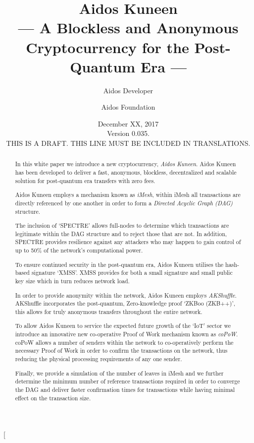 \documentclass[a4paper,10pt,twocolumn]{article}
\title{Aidos Kuneen \\ --- A Blockless and Anonymous Cryptocurrency for the Post-Quantum Era ---}
\author{
	Aidos Developer \and Aidos Foundation
}
\date{December XX, 2017 \\ Version 0.035.\\ THIS IS A DRAFT. THIS LINE MUST BE INCLUDED IN TRANSLATIONS.}
\begin{document}
\twocolumn[
	\maketitle

\begin{abstract}
		In this white paper we introduce a new cryptocurrency, \emph{Aidos Kuneen}. Aidos Kuneen has been developed to deliver a 
		fast, anonymous, blockless, decentralized and scalable solution for post-quantum era transfers with zero fees. 
		
		Aidos Kuneen employs a mechanism known as \emph{iMesh}, within iMesh all transactions are directly referenced by
		one another in order to form a \emph{Directed Acyclic Graph (DAG)} structure.
		
		The inclusion of `SPECTRE' allows full-nodes to determine which transactions are legitimate within the DAG structure and
		to reject those that are not. In addition, SPECTRE provides resilience against any attackers who may happen to gain 
		control of up to 50\% of the network's computational power.
		
		To ensure continued security in the post-quantum era, Aidos Kuneen utilises the hash-based signature `XMSS'. XMSS
		provides for both a small signature and small public key size which in turn reduces network load.
	
		In order to provide anonymity within the network, Aidos Kuneen employs \emph{AKShuffle}. AKShuffle 	
		incorporates the post-quantum, Zero-knowledge proof `ZKBoo (ZKB++)', this allows for truly anonymous transfers 
		throughout the entire network.
		
		To allow Aidos Kuneen to service the expected future growth of the `IoT' sector we introduce an innovative new 
		co-operative Proof of Work mechanism known as \emph{coPoW}. coPoW allows a number of senders within the network to 
		co-operatively perform the necessary Proof of Work in order to confirm the transactions on the network, thus reducing 
		the physical processing requirements of any one sender.
		
		Finally, we provide a simulation of the number of leaves in iMesh and we further determine the minimum number of 
		reference transactions required in order to converge the DAG and deliver faster confirmation times for transactions 
		while having minimal effect on the transaction size.
		
		\end{abstract}

		\vspace{0.5cm}
\end{document}
